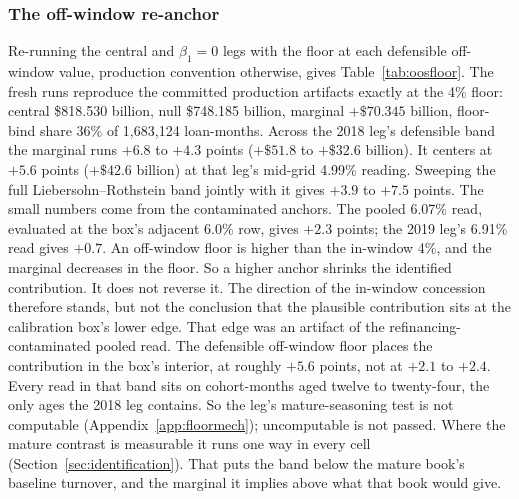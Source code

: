 \documentclass[12pt]{article}
\begin{document}
\subsubsection{The off-window re-anchor}

Re-running the central and $\beta_1 = 0$ legs with the floor at each defensible off-window value, production convention otherwise, gives Table~\ref{tab:oosfloor}. The fresh runs reproduce the committed production artifacts exactly at the 4\% floor: central \$818.530 billion, null \$748.185 billion, marginal $+\$70.345$ billion, floor-bind share 36\% of 1,683,124 loan-months. Across the 2018 leg's defensible band the marginal runs $+6.8$ to $+4.3$ points ($+\$51.8$ to $+\$32.6$ billion). It centers at $+5.6$ points ($+\$42.6$ billion) at that leg's mid-grid 4.99\% reading. Sweeping the full Liebersohn--Rothstein band jointly with it gives $+3.9$ to $+7.5$ points. The small numbers come from the contaminated anchors. The pooled 6.07\% read, evaluated at the box's adjacent 6.0\% row, gives $+2.3$ points; the 2019 leg's 6.91\% read gives $+0.7$. An off-window floor is higher than the in-window 4\%, and the marginal decreases in the floor. So a higher anchor shrinks the identified contribution. It does not reverse it. The direction of the in-window concession therefore stands, but not the conclusion that the plausible contribution sits at the calibration box's lower edge. That edge was an artifact of the refinancing-contaminated pooled read. The defensible off-window floor places the contribution in the box's interior, at roughly $+5.6$ points, not at $+2.1$ to $+2.4$. Every read in that band sits on cohort-months aged twelve to twenty-four, the only ages the 2018 leg contains. So the leg's mature-seasoning test is not computable (Appendix~\ref{app:floormech}); uncomputable is not passed. Where the mature contrast is measurable it runs one way in every cell (Section~\ref{sec:identification}). That puts the band below the mature book's baseline turnover, and the marginal it implies above what that book would give.
\end{document}
